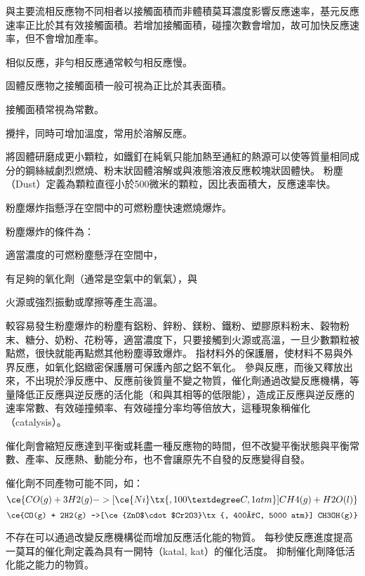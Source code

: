 \documentclass[a4paper,12pt]{article}
\begin{document}
與主要流相反應物不同相者以接觸面積而非體積莫耳濃度影響反應速率，基元反應速率正比於其有效接觸面積。若增加接觸面積，碰撞次數會增加，故可加快反應速率，但不會增加產率。

相似反應，非勻相反應通常較勻相反應慢。

固體反應物之接觸面積一般可視為正比於其表面積。

接觸面積常視為常數。
\bit
\item 攪拌，同時可增加溫度，常用於溶解反應。
\item 將固體研磨成更小顆粒，如鐵釘在純氧只能加熱至通紅的熱源可以使等質量相同成分的鋼絲絨劇烈燃燒、粉末狀固體溶解或與液態溶液反應較塊狀固體快。
\eit
{}
粉塵（Dust）定義為顆粒直徑小於500微米的顆粒，因比表面積大，反應速率快。

粉塵爆炸指懸浮在空間中的可燃粉塵快速燃燒爆炸。

粉塵爆炸的條件為：
\bit
\item 適當濃度的可燃粉塵懸浮在空間中，
\item 有足夠的氧化劑（通常是空氣中的氧氣），與
\item 火源或強烈振動或摩擦等產生高溫。
\eit

較容易發生粉塵爆炸的粉塵有鋁粉、鋅粉、鎂粉、鐵粉、塑膠原料粉末、穀物粉末、糖分、奶粉、花粉等，適當濃度下，只要接觸到火源或高溫，一旦少數顆粒被點燃，很快就能再點燃其他粉塵導致爆炸。
指材料外的保護層，使材料不易與外界反應，如氧化鋁緻密保護層可保護內部之鋁不氧化。
參與反應，而後又釋放出來，不出現於淨反應中、反應前後質量不變之物質，催化劑通過改變反應機構，等量降低正反應與逆反應的活化能（和與其相等的低限能），造成正反應與逆反應的速率常數、有效碰撞頻率、有效碰撞分率均等倍放大，這種現象稱催化（catalysis）。

催化劑會縮短反應達到平衡或耗盡一種反應物的時間，但不改變平衡狀態與平衡常數、產率、反應熱、動能分布，也不會讓原先不自發的反應變得自發。

催化劑不同產物可能不同，如：
\[\ce{CO(g) + 3H2(g) ->[\ce{Ni}\tx{, 100°C, 1 atm}] CH4(g) + H2O(l)}\]
\[\ce{CO(g) + 2H2(g) ->[\ce{ZnO$\cdot$Cr2O3}\tx{, 400°C, 5000 atm}] CH3OH(g)}\]

不存在可以通過改變反應機構從而增加反應活化能的物質。
每秒使反應進度提高一莫耳的催化劑定義為具有一開特（katal, kat）的催化活度。
抑制催化劑降低活化能之能力的物質。
\end{document}
